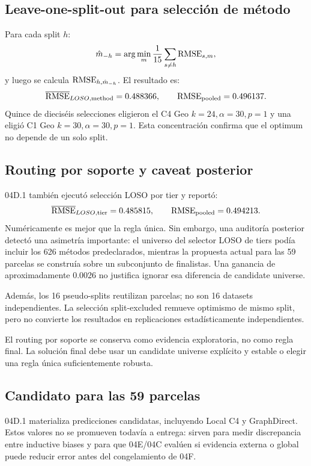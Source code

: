 \subsection{Leave-one-split-out para selección de método}

Para cada split $h$:
\[
\hat m_{-h}
=
\arg\min_m
\frac{1}{15}
\sum_{s\neq h}\operatorname{RMSE}_{s,m},
\]
y luego se calcula $\operatorname{RMSE}_{h,\hat m_{-h}}$. El resultado es:
\[
\overline{\operatorname{RMSE}}_{LOSO,\mathrm{method}}=0.488366,
\qquad
\operatorname{RMSE}_{\mathrm{pooled}}=0.496137.
\]
Quince de dieciséis selecciones eligieron el C4 Geo $k=24,\alpha=30,p=1$ y una eligió C1
Geo $k=30,\alpha=30,p=1$. Esta concentración confirma que el optimum no depende de un solo
split.

\subsection{Routing por soporte y caveat posterior}

04D.1 también ejecutó selección LOSO por tier y reportó:
\[
\overline{\operatorname{RMSE}}_{LOSO,\mathrm{tier}}=0.485815,
\qquad
\operatorname{RMSE}_{\mathrm{pooled}}=0.494213.
\]
Numéricamente es mejor que la regla única. Sin embargo, una auditoría posterior detectó una
asimetría importante: el universo del selector LOSO de tiers podía incluir los 626 métodos
predeclarados, mientras la propuesta actual para las 59 parcelas se construía sobre un
subconjunto de finalistas. Una ganancia de aproximadamente 0.0026 no justifica ignorar esa
diferencia de candidate universe.

Además, los 16 pseudo-splits reutilizan parcelas; no son 16 datasets independientes. La
selección split-excluded remueve optimismo de mismo split, pero no convierte los resultados
en replicaciones estadísticamente independientes.

\begin{decision}
El routing por soporte se conserva como evidencia exploratoria, no como regla final. La
solución final debe usar un candidate universe explícito y estable o elegir una regla única
suficientemente robusta.
\end{decision}

\subsection{Candidato para las 59 parcelas}

04D.1 materializa predicciones candidatas, incluyendo Local C4 y GraphDirect. Estos valores no
se promueven todavía a entrega: sirven para medir discrepancia entre inductive biases y para
que 04E/04C evalúen si evidencia externa o global puede reducir error antes del congelamiento
de 04F.

